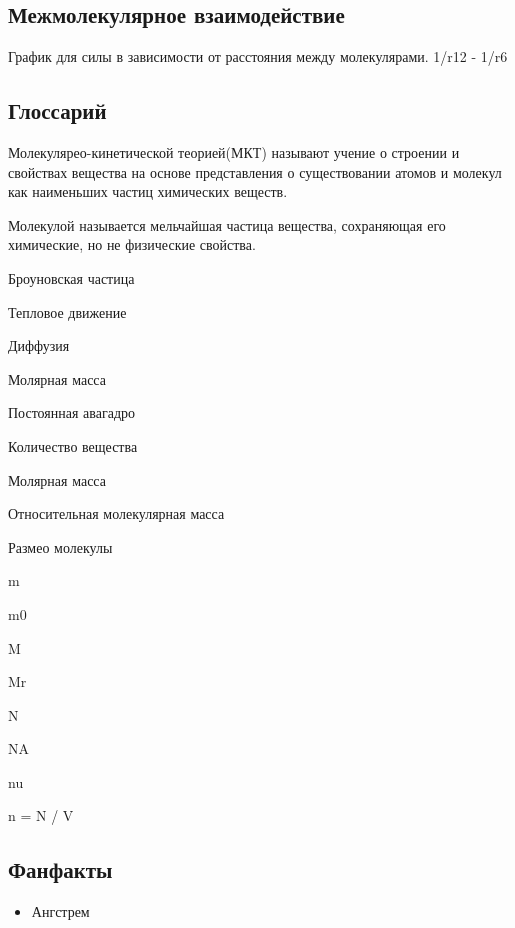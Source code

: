 \documentclass{article}
\begin{document}
\subsection{Межмолекулярное взаимодействие}

График для силы в зависимости от расстояния между молекулярами.
1/r12 - 1/r6 

\subsection{Глоссарий}

Молекулярео-кинетической теорией(МКТ) называют учение о строении и свойствах вещества на основе представления о 
существовании атомов и молекул как наименьших частиц химических веществ. 

Молекулой называется мельчайшая частица вещества, сохраняющая его химические, но не физические свойства.

Броуновская частица

Тепловое движение

Диффузия

Молярная масса

Постоянная авагадро

Количество вещества

Молярная масса

Относительная молекулярная масса

Размео молекулы

m 

m0 

M 

Mr 

N 

NA 

nu 

n = N / V 

\subsection{Фанфакты}
\begin{itemize}
  \item Ангстрем 
\end{itemize}
\end{document}
